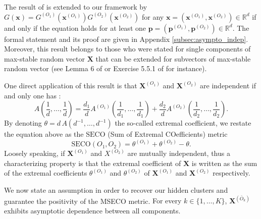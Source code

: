 \documentclass[11pt]{article}
\newcommand{\SECO}{\mathrm{SECO}}
\theoremstyle{definition}
\newenvironment{Assumption}[1]
  {\renewcommand\theinnerassumption{#1}\innerassumption}
  {\endinnerassumption}
\begin{document}
	 The result of \cite{takahashi1994asymptotic} is extended to our framework by $G(\textbf{x}) = G^{(O_1)}(\textbf{x}^{(O_1)}) G^{(O_2)}(\textbf{x}^{(O_2)})$ for any $\textbf{x} = (\textbf{x}^{(O_1)}, \textbf{x}^{(O_2)}) \in \mathbb{R}^d$ if and only if the equation holds for at least one $\textbf{p} = (\textbf{p}^{(O_1)}, \textbf{p}^{(O_2)}) \in \mathbb{R}^d$. The formal statement and its proof are given in Appendix \ref{subsec:asympto_indep}. Moreover, this result belongs to those who were stated for single components of max-stable random vector $\textbf{X}$ that can be extended for subvectors of max-stable random vector (see Lemma 6 of \cite{papastathopoulos2016conditional} or Exercise 5.5.1 of \cite{resnick2008extreme} for instance).
	 
	  One direct application of this result is that $\textbf{X}^{(O_1)}$ and $\textbf{X}^{(O_2)}$ are independent if and only one has :
	\begin{equation*}
		A\left(\frac{1}{d}, \dots, \frac{1}{d}\right) = \frac{d_1}{d} A^{(O_1)}\left( \frac{1}{d_1}, \dots, \frac{1}{d_1} \right) + \frac{d_2}{d} A^{(O_2)}\left( \frac{1}{d_2}, \dots, \frac{1}{d_2} \right).
	\end{equation*}
	By denoting $\theta = d \, A (d^{-1}, \dots, d^{-1})$ the so-called extremal coefficient, we restate the equation above as the $\SECO$ (Sum of Extremal COefficients) metric
	\begin{equation}
		\SECO(O_1, O_2) = \theta^{(O_1)} + \theta^{(O_2)} - \theta.
	\end{equation}
	Loosely speaking, if $\textbf{X}^{(O_1)}$ and $X^{(O_2)}$ are mutually independent, thus a characterizing property is that the extremal coefficient of $\textbf{X}$ is written as the sum of the extremal coefficients $\theta^{(O_1)}$ and $\theta^{(O_2)}$ of $\textbf{X}^{(O_1)}$ and $\textbf{X}^{(O_2)}$ respectively.
	
	We now state an assumption in order to recover our hidden clusters and guarantee the positivity of the MSECO metric. 
	\begin{Assumption}
		A For every $k \in \{1,\dots, K\}$, $\textbf{X}^{(\bar{O}_k)}$ exhibits asymptotic dependence between all components.
		\label{ass:A}
	\end{Assumption}
	
\end{document}
